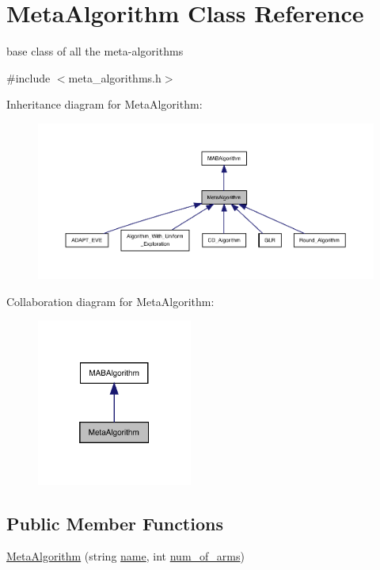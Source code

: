 \hypertarget{class_meta_algorithm}{}\section{Meta\+Algorithm Class Reference}
\label{class_meta_algorithm}


base class of all the meta-\/algorithms  




{\ttfamily \#include $<$meta\+\_\+algorithms.\+h$>$}



Inheritance diagram for Meta\+Algorithm\+:
\nopagebreak
\begin{figure}[H]
\begin{center}
\leavevmode
\includegraphics[width=350pt]{class_meta_algorithm__inherit__graph}
\end{center}
\end{figure}


Collaboration diagram for Meta\+Algorithm\+:
\nopagebreak
\begin{figure}[H]
\begin{center}
\leavevmode
\includegraphics[width=145pt]{class_meta_algorithm__coll__graph}
\end{center}
\end{figure}
\subsection*{Public Member Functions}
\begin{DoxyCompactItemize}
\item 
\mbox{\hyperlink{class_meta_algorithm_a747f056c3483bf967b5cc69fef251cd0}{Meta\+Algorithm}} (string \mbox{\hyperlink{class_m_a_b_algorithm_a77b10ecc4b49d519c557f65358167b82}{name}}, int \mbox{\hyperlink{class_m_a_b_algorithm_a340fa9e83e85b092f2c6125fc4e8549b}{num\+\_\+of\+\_\+arms}})
\end{DoxyCompactItemize}
